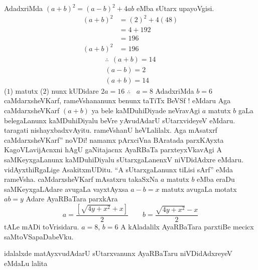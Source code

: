 AdadxriMda $(a+b)^2 = (a-b)^2 + 4ab$ eMba sUtarx upayoVgisi.
\begin{align*}
  (a+b)^2 & = (2)^2 +4 (48)\\
  & = 4+192\\
  & = 196\\
  (a+b)^2 & = 196   
\end{align*}
\begin{gather*}
  \therefore ~~ (a+b) = 14\\
  (a-b) =2 \tag{$1$}\\
  (a+b) = 14 \tag{$2$}
\end{gather*}
($1$) matutx ($2$) nunx kUDidare $2a = 16$ $\therefore$ ~$a=8$  AdadxriMda $b =6$
caMdarxsheVKarf, rameVshananunx benunx taTiTx BeVSf ! eMdaru Aga caMdarxsheVKarf
$(a+b)$ ya bele kaMDuhiDiyade neVravAgi $a$ matutx $b$ gaLa belegaLanunx kaMDuhiDiyalu beVre yAvudAdarU sUtarxvideyeV eMdaru. taragati nishayxbadxvAyitu. rameVshanU heVLalilalx. Aga mAsatxrf caMdarxsheVKarf'' noVDi! namamx pArxciVna BAratada parxKAyxta KagoVLavijAcnxni hAgU gaNitajacnx AyaRBaTa parxteyxVkavAgi A saMKeyxgaLanunx kaMDuhiDiyalu sUtarxgaLanenxV niVDidAdxre eMdaru.  vidAyxthiRgaLige AsakitxmUDitu. ``A sUtarxgaLanunx tiLisi sArf'' eMda rameVsha. caMdarxsheVKarf mAsatxru takaSxNa $a$ matutx $b$ eMba eraDu saMKeyxgaLAdare avugaLa vayxtAyxsa $a-b=x$ matutx avugaLa motatx $ab=y$ Adare AyaRBaTara parxkAra
$$
a = \frac{\left[\sqrt{4y+x^2} +x \right]}{2}\qquad  b = \frac{\sqrt{4y+x^2} - x}{2}
$$
tALe mADi toVrisidaru. $a=8$, $b=6$ A kAladalilx AyaRBaTara parxtiBe mecicx saMtoVSapaDabeVku.

idalalxde matAyxvudAdarU sUtarxvanunx AyaRBaTaru niVDidAdxreyeV eMdaLu lalita

